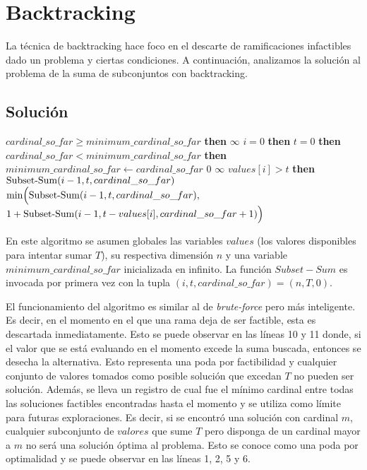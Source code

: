 \section{Backtracking}
La técnica de backtracking hace foco en el descarte de ramificaciones infactibles dado un problema y ciertas condiciones. A continuación, analizamos la solución al problema de la suma de subconjuntos con backtracking.

\subsection{Solución}
\begin{center}
	\begin{minipage}{.8\textwidth}
		\begin{codebox}
				\li \If $cardinal\_so\_far \geq minimum\_cardinal\_so\_far$ \textbf{then} \Then
					\li \Return $\infty$
				\End
				\zi
				\li \If $i = 0$ \textbf{then} \Then
					\li \If $t = 0$ \textbf{then}
					\li \Then
						\If $cardinal\_so\_far < minimum\_cardinal\_so\_far$ \textbf{then} \Then
							\li $minimum\_cardinal\_so\_far \leftarrow cardinal\_so\_far$
						\End
						\zi
						\li \Return $0$
					\li \Else
						\li \Return $\infty$
					\End
				\li \Else \If $values[i] > t$ \textbf{then}
					\li \Return $\func{Subset-Sum}(i - 1, t, cardinal\_so\_far)$
				\li \Else
					\li \Return $\func{min}\Big(\func{Subset-Sum}(i - 1, t, cardinal\_so\_far),$
					\Indentmore \Indentmore \zi $1 + \func{Subset-Sum}(i - 1, t - values[i], cardinal\_so\_far + 1)\Big)$
				\End
			\End
		\end{codebox}

		\label{fig:alg-backtracking}
	\end{minipage}
\end{center}

En este algoritmo se asumen globales las variables $values$ (los valores disponibles para intentar sumar $T$), su respectiva dimensión $n$ y una variable $minimum\_cardinal\_so\_far$ inicializada en infinito. La función $Subset-Sum$ es invocada por primera vez con la tupla $(i, t, cardinal\_so\_far) = (n, T, 0)$.

\vskip 8pt

El funcionamiento del algoritmo es similar al de \textit{brute-force} pero más inteligente. Es decir, en el momento en el que una rama deja de ser factible, esta es descartada inmediatamente. Esto se puede observar en las líneas 10 y 11 donde, si el valor que se está evaluando en el momento excede la suma buscada, entonces se desecha la alternativa. Esto representa una poda por factibilidad y cualquier conjunto de valores tomados como posible solución que excedan $T$ no pueden ser solución. Además, se lleva un registro de cual fue el mínimo cardinal entre todas las soluciones factibles encontradas hasta el momento y se utiliza como límite para futuras exploraciones. Es decir, si se encontró una solución con cardinal $m$, cualquier subconjunto de $valores$ que sume $T$ pero disponga de un cardinal mayor a $m$ no será una solución óptima al problema. Esto se conoce como una poda por optimalidad y se puede observar en las líneas 1, 2, 5 y 6.

